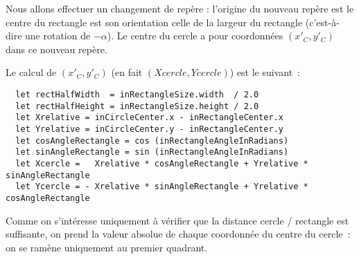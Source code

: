 Nous allons effectuer un changement de repère : l'origine du nouveau repère est le centre du rectangle est son orientation celle de la largeur du rectangle (c'est-à-dire une rotation de $-\alpha$). Le centre du cercle a pour coordonnées $(x'_C, y'_C)$ dans ce nouveau repère.

\begin{center}
\end{center}


Le calcul de $(x'_C, y'_C)$ (en fait $(Xcercle, Ycercle)$) est le suivant~:

\begin{lstlisting}
  let rectHalfWidth  = inRectangleSize.width  / 2.0
  let rectHalfHeight = inRectangleSize.height / 2.0
  let Xrelative = inCircleCenter.x - inRectangleCenter.x
  let Yrelative = inCircleCenter.y - inRectangleCenter.y
  let cosAngleRectangle = cos (inRectangleAngleInRadians)
  let sinAngleRectangle = sin (inRectangleAngleInRadians)
  let Xcercle =   Xrelative * cosAngleRectangle + Yrelative * sinAngleRectangle
  let Ycercle = - Xrelative * sinAngleRectangle + Yrelative * cosAngleRectangle
\end{lstlisting}

Comme on s'intéresse uniquement à vérifier que la distance cercle / rectangle est suffisante, on prend la valeur absolue de chaque coordonnée du centre du cercle~: on se ramène uniquement au premier quadrant.

\begin{center}
\end{center}


